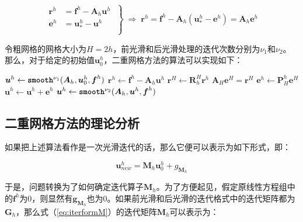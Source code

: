 \documentclass[12pt, UTF8, nofonts]{ctexart}
\begin{document}
\begin{equation}
  \label{eq:errres}
  \left.\begin{aligned}
    \boldsymbol{r}^h &= \boldsymbol{f}^h - \boldsymbol{A}_h\boldsymbol{u}^h \\ \boldsymbol{e}^h &= \boldsymbol{u}^h_{\ast} - \boldsymbol{u}^h \\
  \end{aligned}\;\right\} \;\Rightarrow\;
  \boldsymbol{r}^h = \boldsymbol{f}^h - \boldsymbol{A}_h(\boldsymbol{u}_\ast^h-\boldsymbol{e}^h) = \boldsymbol{A}_h\boldsymbol{e}^h
\end{equation}

令粗网格的网格大小为$H=2h$，前光滑和后光滑处理的迭代次数分别为$\nu_1$和$\nu_2$。那么，对于给定的初始值$\boldsymbol{u}_{0}^{h}$，二重网格方法的算法可以实现如下：

\begin{algorithm}[H]
  $\boldsymbol{u}^h \gets \textbf{\texttt{smooth}}^{\nu_1}(\boldsymbol{A}_h,\boldsymbol{u}_{0}^h,\boldsymbol{f}^h)$
  $\boldsymbol{r}^h \gets \boldsymbol{f}^h - \boldsymbol{A}_h \boldsymbol{u}^h$
  $\boldsymbol{r}^{H} \gets \boldsymbol{R}_{h}^{H}\boldsymbol{r}^h$
  $\boldsymbol{A}_{H} \boldsymbol{e}^{H} = \boldsymbol{r}^{H}$
  $\boldsymbol{e}^h \gets \boldsymbol{P}_{H}^{h} \boldsymbol{e}^{H}$
  $\boldsymbol{u}^h \gets \boldsymbol{u}^h + \boldsymbol{e}^h$
  $\boldsymbol{u}^h \gets \textbf{\texttt{smooth}}^{\nu_2}(\boldsymbol{A}_h, \boldsymbol{u}^h, \boldsymbol{f}^h)$
\end{algorithm}

\subsection*{二重网格方法的理论分析}

如果把上述算法看作是一次光滑迭代的话，那么它便可以表示为如下形式，即：

\begin{equation}
  \label{eq:iterformM}
  \boldsymbol{u}_{new}^{h} = \boldsymbol{M}_{h}\boldsymbol{u}_0^h + g_{\boldsymbol{M}_h}
\end{equation}

于是，问题转换为了如何确定迭代算子$\boldsymbol{M}_h$。为了方便起见，假定原线性方程组中的$\boldsymbol{f}^h$为$0$，则显然有$\boldsymbol{g}_{\boldsymbol{M}_h}$也为$0$。如果前光滑和后光滑的迭代格式中的迭代矩阵都为$\boldsymbol{G}_h$，那么式（\ref{eq:iterformM}）的迭代矩阵$\boldsymbol{M}_h$可以表示为：
\end{document}
